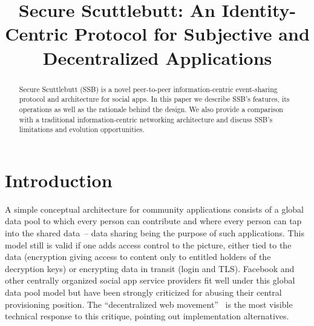 \documentclass[10pt,sigconf,rewiew]{acmart}
\title{Secure Scuttlebutt: An Identity-Centric Protocol for Subjective and Decentralized Applications }
\begin{document}

\begin{abstract}
  Secure Scuttlebutt (SSB) is a novel peer-to-peer information-centric
  event-sharing protocol and architecture for social apps. In this
  paper we describe SSB's features, its operations as well as the
  rationale behind the design. We also provide a comparison with
  a traditional information-centric networking architecture and discuss
  SSB's limitations and evolution opportunities.


\end{abstract}

\maketitle


\section{Introduction}

A simple conceptual architecture for community applications consists
of a global data pool to which every person can contribute and where
every person can tap into the shared data~-- data sharing being the
purpose of such applications. This model still is valid if one adds
access control to the picture, either tied to the data (encryption
giving access to content only to entitled holders of the decryption
keys) or encrypting data in transit (login and TLS). Facebook and
other centrally organized social app service providers fit well under
this global data pool model but have been strongly criticized for
abusing their central provisioning position.  The ``decentralized web
movement''~\cite{decent-2018-aug} is the most visible technical
response to this critique, pointing out implementation alternatives.
\end{document}
